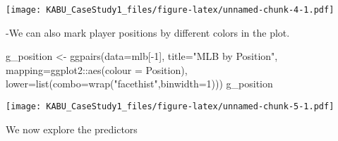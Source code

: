 \documentclass[
]{article}
\newenvironment{Shaded}{\begin{snugshade}}{\end{snugshade}}
\newcommand{\AttributeTok}[1]{\textcolor[rgb]{0.77,0.63,0.00}{#1}}
\newcommand{\DecValTok}[1]{\textcolor[rgb]{0.00,0.00,0.81}{#1}}
\newcommand{\FunctionTok}[1]{\textcolor[rgb]{0.00,0.00,0.00}{#1}}
\newcommand{\NormalTok}[1]{#1}
\newcommand{\OtherTok}[1]{\textcolor[rgb]{0.56,0.35,0.01}{#1}}
\newcommand{\SpecialCharTok}[1]{\textcolor[rgb]{0.00,0.00,0.00}{#1}}
\newcommand{\StringTok}[1]{\textcolor[rgb]{0.31,0.60,0.02}{#1}}
\begin{document}
\begin{Shaded}
\end{Shaded}

\texttt{[image: KABU\_CaseStudy1\_files/figure-latex/unnamed-chunk-4-1.pdf]}

-We can also mark player positions by different colors in the plot.

\begin{Shaded}
\begin{Highlighting}[]
\NormalTok{g\_position }\OtherTok{\textless{}{-}} \FunctionTok{ggpairs}\NormalTok{(}\AttributeTok{data=}\NormalTok{mlb[}\SpecialCharTok{{-}}\DecValTok{1}\NormalTok{], }\AttributeTok{title=}\StringTok{"MLB by Position"}\NormalTok{,}
                      \AttributeTok{mapping=}\NormalTok{ggplot2}\SpecialCharTok{::}\FunctionTok{aes}\NormalTok{(}\AttributeTok{colour =}\NormalTok{ Position),}
                      \AttributeTok{lower=}\FunctionTok{list}\NormalTok{(}\AttributeTok{combo=}\FunctionTok{wrap}\NormalTok{(}\StringTok{"facethist"}\NormalTok{,}\AttributeTok{binwidth=}\DecValTok{1}\NormalTok{)))}
\NormalTok{g\_position}
\end{Highlighting}
\end{Shaded}

\texttt{[image: KABU\_CaseStudy1\_files/figure-latex/unnamed-chunk-5-1.pdf]}

We now explore the predictors
\end{document}
